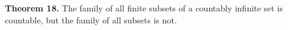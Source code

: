 \textbf{Theorem 18.} The family of all finite subsets of a countably infinite set is countable, but the family of all subsets is not.
